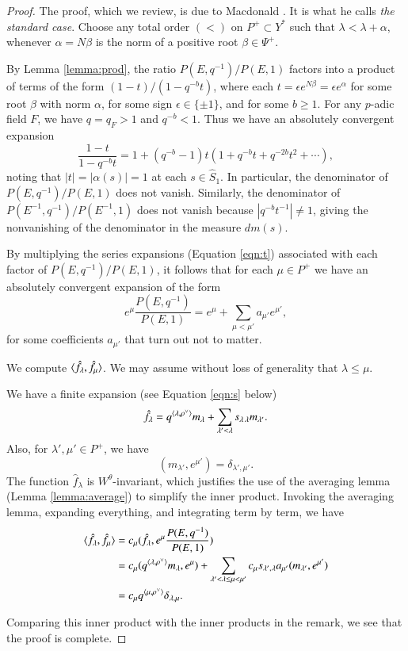 \begin{proof}  
  The proof, which we review, is due to Macdonald
  \cite[Ch.V]{macdonaldspherical}.  It is what he calls {\it the
    standard case}.  Choose any total order $(<)$ on $P^+\subset Y^*$
  such that $\lambda < \lambda + \alpha$, whenever $\alpha = N\beta$
  is the norm of a positive root $\beta\in\Psi^+$.

  By Lemma \ref{lemma:prod}, the ratio $P(E,q^{-1})/P(E,1)$ factors
  into a product of terms of the form $(1- t)/(1- q^{-b} t)$, where
  each $t = \epsilon e^{N\beta} = \epsilon e^\alpha$ for some root
  $\beta$ with norm $\alpha$, for some sign $\epsilon\in \{\pm 1\}$,
  and for some $b\ge 1$.  For any $p$-adic field $F$, we have $q = q_F
  > 1$ and $q^{-b} < 1$.  Thus we have an absolutely convergent
  expansion
\begin{equation}\label{eqn:t}
\frac{1- t}{1- q^{-b} t} = 1 + (q^{-b}-1) t (1+ q^{-b} t + q^{-2b} t^2 + \cdots),
\end{equation}
noting that $|t| = |\alpha(s)|=1$ at each $s\in \hat S_1$.  In
particular, the denominator of $P(E,q^{-1})/P(E,1)$ does not vanish.
Similarly, the denominator of $P(E^{-1},q^{-1})/P(E^{-1},1)$ does not
vanish because $|q^{-b} t^{-1}|\ne1$, giving the nonvanishing of the
denominator in the measure $dm(s)$.

By multiplying the series expansions (Equation \ref{eqn:t}) associated
with each factor of $P(E,q^{-1})/P(E,1)$, it follows that for each
$\mu\in P^+$ we have an absolutely convergent expansion of the form
\[
e^\mu \frac{P(E,q^{-1})}{P(E,1)} = e^\mu +\sum_{\mu< \mu'} a_{\mu'} e^{\mu'},
\] 
for some coefficients $a_{\mu'}$ that turn out not to matter.

We compute $\langle{\hat f_\lambda,\hat f_\mu}\rangle$.  We may assume without
loss of generality that $\lambda \le \mu$.


We have a finite expansion (see Equation \ref{eqn:s} below)
\[
\hat f_\lambda = q^{\langle{\lambda,\rho^\vee}\rangle} m_\lambda 
+ \sum_{\lambda' <\lambda } s_{\lambda\,\lambda} m_{\lambda'}.
\]
Also, for $\lambda',\mu'\in P^+$, we have
\[
(m_{\lambda'},e^{\mu'}) = \delta_{\lambda',{\mu'}}.
\]
The function $\hat f_\lambda$ is $W^\theta$-invariant, which justifies
the use of the averaging lemma (Lemma \ref{lemma:average}) to simplify
the inner product.  Invoking the averaging lemma, expanding
everything, and integrating term by term, we have
\begin{align*}
\langle{\hat f_\lambda,\hat f_\mu}\rangle 
&= c_\mu (\hat f_\lambda, e^\mu \frac{ P(E,q^{-1})}{P(E,1)})\\
&= c_\mu (q^{\langle{\lambda,\rho^\vee}\rangle} m_\lambda,e^\mu) 
+ \sum_{\lambda' < \lambda\le\mu < \mu'}
c_\mu s_{\lambda',\lambda} a_{\mu'} (m_{\lambda'},e^{\mu'})\\ 
&= c_\mu q^{\langle{\mu,\rho^\vee}\rangle} \delta_{\lambda,\mu}.
\end{align*}

Comparing this inner product with the inner products in the remark, we
see that the proof is complete.
\end{proof}

